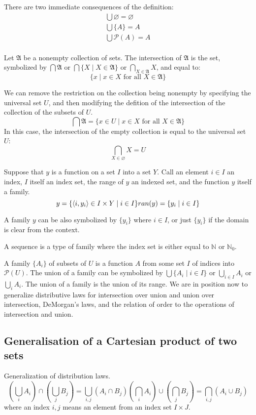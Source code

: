 \documentclass[letterpaper, 10pt]{article}
\newcommand{\set}[1]{\{#1\}}
\newcommand{\tuple}[1]{\langle #1 \rangle}
\newcommand{\family}[1]{\mathfrak{#1}}
\newcommand{\powerset}[1]{\mathcal{P}(#1)}
\begin{document}
	There are two immediate consequences of the definition:
	\begin{gather}
		\bigcup\varnothing = \varnothing \\
		\bigcup\set{A} = A \\
		\bigcup\powerset{A} = A \\
	\end{gather}

	Let $\family{A}$ be a nonempty collection of sets. The intersection of
	$\family{A}$ is the set, symbolized by $\bigcap\family{A}$ or
	$\bigcap\set{X\mid X \in \family{A}}$ or $\bigcap_{X\in\family{A}}X$, and
	equal to: $$ \set{x\mid x\in X \text{ for all } X\in\family{A}} $$

	We can remove the restriction on the collection being nonempty by specifying
	the universal set $U$, and then modifying the defition of the intersection
	of the collection of the subsets of $U$.
	$$
	\bigcap\family{A} = \set{x\in U\mid x\in X \text{ for all } X\in\family{A}}
	$$
	In this case, the intersection of the empty collection is equal to the
	universal set $U$:
	$$
	\bigcap_{X\in\varnothing}X = U
	$$

	Suppose that $y$ is a function on a set $I$ into a set $Y$. Call an element
	$i\in I$ an index, $I$ itself an index set, the range of $y$ an indexed set,
	and the function $y$ itself a family.
	$$
	y = \set{\tuple{i,y_i}\in I\times Y\mid i \in I} \\
	ran(y) = \set{y_i\mid i\in I}
	$$

	A family $y$ can be also symbolized by $\set{y_i}$ where $i\in I$, or just
	$\set{y_i}$ if the domain is clear from the context.

	A sequence is a type of family where the index set is either equal to
	$\mathbb{N}$ or $\mathbb{N}_0$.

	A family $\set{A_i}$ of subsets of $U$ is a function $A$ from some set $I$
	of indices into $\powerset{U}$.
	The union of a family can be symbolized by $\bigcup\set{A_i\mid i\in I}$ or
	$\bigcup_{i\in I}A_i$ or $\bigcup_i A_i$. The union of a family is the union
	of its range.
	We are in position now to generalize distributive laws for intersection over
	union and union over intersection, DeMorgan's laws, and the relation of
	order to the operations of intersection and union.
	\subsection{Generalisation of a Cartesian product of two sets}
	
	Generalization of distribution laws.
	$$
	(\bigcup_i A_i)\cap(\bigcup_j B_j) = \bigcup_{i,j} (A_i \cap B_j)
	(\bigcap_i A_i)\cup(\bigcap_j B_j) = \bigcap_{i,j} (A_i \cup B_j)
	$$
	where an index $i,j$ means an element from an index set $I\times J$.
\end{document}
